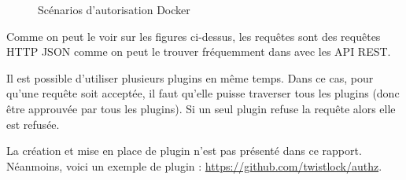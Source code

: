 \documentclass[11pt,a4paper,oneside]{report}
\begin{document}
\begin{figure}[H]
    \hfill

    \caption[]{Scénarios d'autorisation Docker\protect{\footnotemark}}
\end{figure}


Comme on peut le voir sur les figures ci-dessus, les requêtes sont des requêtes HTTP JSON comme on peut le trouver fréquemment dans avec les API REST.

Il est possible d'utiliser plusieurs plugins en même temps. Dans ce cas, pour qu'une requête soit acceptée, il faut qu'elle puisse traverser tous les plugins (donc être approuvée par tous les plugins). Si un seul plugin refuse la requête alors elle est refusée.

La création et mise en place de plugin n'est pas présenté dans ce rapport. Néanmoins, voici un exemple de plugin : \url{https://github.com/twistlock/authz}.
\end{document}
